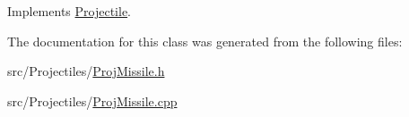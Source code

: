 Implements \mbox{\hyperlink{class_projectile_ad8fae955389ff8944830e9d80e0f1ce1}{Projectile}}.



The documentation for this class was generated from the following files\+:\begin{DoxyCompactItemize}
\item 
src/\+Projectiles/\mbox{\hyperlink{_proj_missile_8h}{Proj\+Missile.\+h}}\item 
src/\+Projectiles/\mbox{\hyperlink{_proj_missile_8cpp}{Proj\+Missile.\+cpp}}\end{DoxyCompactItemize}
